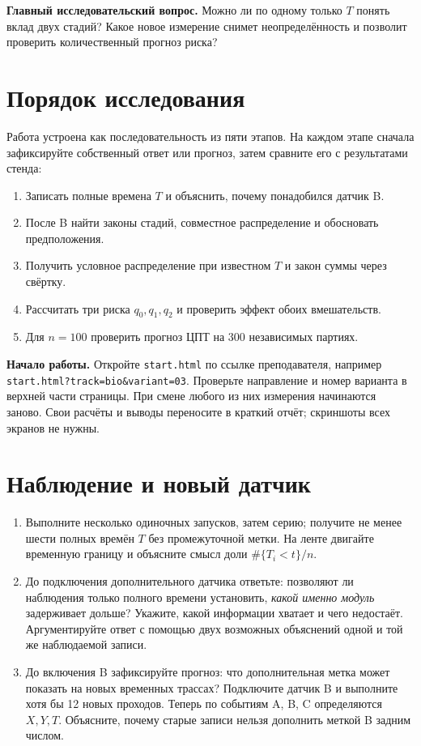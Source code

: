 \documentclass[12pt,a4paper]{article}
\begin{document}
\begin{studentnote}
\textbf{Главный исследовательский вопрос.} Можно ли по одному только $T$ понять вклад двух стадий? Какое новое измерение снимет неопределённость и позволит проверить количественный прогноз риска?
\end{studentnote}

\section*{Порядок исследования}
Работа устроена как последовательность из пяти этапов. На каждом этапе сначала зафиксируйте собственный ответ или прогноз, затем сравните его с результатами стенда:
\begin{enumerate}[topsep=4pt,itemsep=2pt]
\item Записать полные времена $T$ и объяснить, почему понадобился датчик B.
\item После B найти законы стадий, совместное распределение и обосновать предположения.
\item Получить условное распределение при известном $T$ и закон суммы через свёртку.
\item Рассчитать три риска $q_0,q_1,q_2$ и проверить эффект обоих вмешательств.
\item Для $n=100$ проверить прогноз ЦПТ на 300 независимых партиях.
\end{enumerate}
\noindent\textbf{Начало работы.} Откройте \texttt{start.html} по ссылке преподавателя, например \texttt{start.html?track=bio\&variant=03}. Проверьте направление и номер варианта в верхней части страницы. При смене любого из них измерения начинаются заново. Свои расчёты и выводы переносите в краткий отчёт; скриншоты всех экранов не нужны.

\section{Наблюдение и новый датчик}
\begin{enumerate}
\item Выполните несколько одиночных запусков, затем серию; получите не менее шести полных времён \(T\) без промежуточной метки. На ленте двигайте временную границу и объясните смысл доли \(\#\{T_i<t\}/n\).
\item До подключения дополнительного датчика ответьте: позволяют ли наблюдения только полного времени установить, \emph{какой именно модуль} задерживает дольше? Укажите, какой информации хватает и чего недостаёт. Аргументируйте ответ с помощью двух возможных объяснений одной и той же наблюдаемой записи.
\item До включения B зафиксируйте прогноз: что дополнительная метка может показать на новых временных трассах? Подключите датчик B и выполните хотя бы 12 новых проходов. Теперь по событиям A, B, C определяются \(X,Y,T\). Объясните, почему старые записи нельзя дополнить меткой B задним числом.
\end{enumerate}
\end{document}
